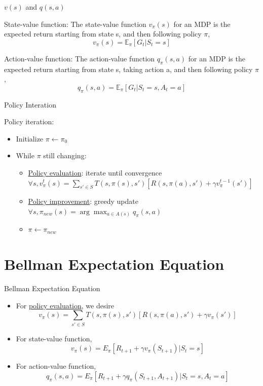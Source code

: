 \documentclass{beamer}
\begin{document}
\begin{frame}{$v(s)$ and $q(s,a)$}
\begin{exampleblock}{State-value function:}
    The state-value function $v_\pi(s)$ for an MDP is the expected
    return starting from state s, and then following policy $\pi$,
    \[
        v_\pi(s) = \mathbb{E}_\pi[G_t|S_t = s]
    \]
\end{exampleblock}

\begin{exampleblock}{Action-value function:}
    The action-value function $q_\pi(s,a)$ for an MDP is the expected
    return starting from state s, taking action a,
    and then following policy $\pi$,
    \[
        q_\pi(s,a) = \mathbb{E}_\pi[G_t|S_t = s, A_t = a]
    \]
\end{exampleblock}   
\end{frame}


\begin{frame}{Policy Interation}
    \begin{exampleblock}{Policy iteration:}
  	\begin{itemize}
  		\item Initialize $\pi \gets \pi_0$
  		\item While $\pi$ still changing:
  		\begin{itemize}
  			\item \underline{Policy evaluation}: iterate until convergence
  			$\forall s,
  			v^t_\pi(s) = \sum_{s'\in S} T(s, \pi(s), s')[R(s, \pi(a), s') + \gamma v^{t-1}_\pi(s')]$
  			\item \underline{Policy improvement}: greedy update
			$\forall s,
			\pi_{new}(s) = \arg\max_{a\in A(s)} q_{\pi}(s, a)$
  			\item $\pi \gets \pi_{new}$
  		\end{itemize}
  	\end{itemize}
    \end{exampleblock}
\end{frame}


\section{Bellman Expectation Equation}



\begin{frame}{Bellman Expectation Equation}
    \begin{itemize}
    	\item For \underline{policy evaluation}, we desire
  		\[
  		v_\pi(s) = \sum_{s'\in S} T(s, \pi(s), s')[R(s, \pi(a), s') + \gamma v_\pi(s')]
  		\]
        \item For state-value function,
        \[
        v_\pi(s) 
        = E_{\pi}[R_{t+1} + \gamma v_\pi(S_{t+1})|S_t = s]
        \]
        
        \item For action-value function,
        \[
        q_{\pi}(s, a) 
        = E_{\pi}[R_{t+1} 
        + \gamma q_{\pi}(S_{t+1}, A_{t+1})|S_t = s, A_t=a]
        \]
    \end{itemize}
\end{frame}
\end{document}
